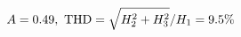 \documentclass[preview]{standalone}
\begin{document}
\begin{align*}
\special{dvisvgm:raw <g id='unique000'>}A=0.49,\ \text{THD}=\sqrt{H_2^2+H_3^2}/H_1=9.5\%\special{dvisvgm:raw </g>}
\end{align*}
\end{document}
